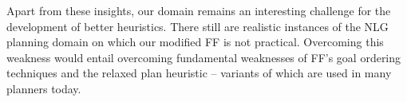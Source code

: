 

Apart from these insights, our domain remains an interesting challenge
for the development of better heuristics. There still are realistic
instances of the NLG planning domain on which our modified FF is not
practical. Overcoming this weakness would entail overcoming
fundamental weaknesses of FF's goal ordering techniques and the
relaxed plan heuristic -- variants of which are used in many planners
today.








%



